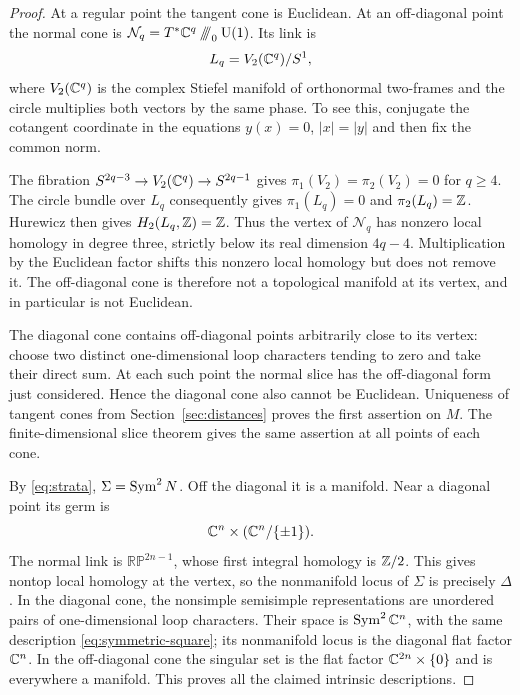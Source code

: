 \begin{proof}
At a regular point the tangent cone is Euclidean.
At an off-diagonal point the normal cone is
$\mathcal N_q=T^*\mathbb C^q\mathbin{/\!\!/\!\!/}_0\operatorname{U}(1)$. Its link is
\begin{equation}\label{eq:link}
 L_q=V_2(\mathbb C^q)/S^1,
\end{equation}
where $V_2(\mathbb C^q)$ is the complex Stiefel manifold
of orthonormal two-frames and the circle multiplies
both vectors by the same phase. To see this, conjugate
the cotangent coordinate in the equations
$y(x)=0$, $|x|=|y|$ and then fix the common norm.

The fibration
$S^{2q-3}\to V_2(\mathbb C^q)\to S^{2q-1}$ gives
$\pi_1(V_2)=\pi_2(V_2)=0$ for $q\ge4$.
The circle bundle over $L_q$ consequently gives
$\pi_1(L_q)=0$ and $\pi_2(L_q)=\mathbb Z$. Hurewicz
then gives $H_2(L_q,\mathbb Z)=\mathbb Z$. Thus the vertex
of $\mathcal N_q$ has nonzero local homology in
degree three, strictly below its real dimension
$4q-4$. Multiplication by the Euclidean factor
shifts this nonzero local homology but does not
remove it. The off-diagonal cone is therefore not
a topological manifold at its vertex, and in
particular is not Euclidean.

The diagonal cone contains off-diagonal points
arbitrarily close to its vertex: choose two
distinct one-dimensional loop characters tending
to zero and take their direct sum. At each such
point the normal slice has the off-diagonal form
just considered. Hence the diagonal cone also
cannot be Euclidean. Uniqueness of tangent cones
from Section~\ref{sec:distances} proves the first
assertion on $M$. The finite-dimensional slice
theorem gives the same assertion at all points
of each cone.

By \eqref{eq:strata}, $\Sigma=\operatorname{Sym}^2N$.
Off the diagonal it is a manifold. Near a
diagonal point its germ is
\begin{equation}\label{eq:symmetric-square}
 \mathbb C^n\times(\mathbb C^n/\{\pm1\}).
\end{equation}
The normal link is $\mathbb{RP}^{2n-1}$, whose
first integral homology is $\mathbb Z/2$. This gives
nontop local homology at the vertex, so the
nonmanifold locus of $\Sigma$ is precisely
$\Delta$. In the diagonal cone, the nonsimple
semisimple representations are unordered pairs
of one-dimensional loop characters. Their
space is $\operatorname{Sym}^2\mathbb C^n$, with the same description
\eqref{eq:symmetric-square}; its nonmanifold
locus is the diagonal flat factor $\mathbb C^n$.
In the off-diagonal cone the singular set is
the flat factor $\mathbb C^{2n}\times\{0\}$ and is
everywhere a manifold. This proves all the
claimed intrinsic descriptions.
\end{proof}

